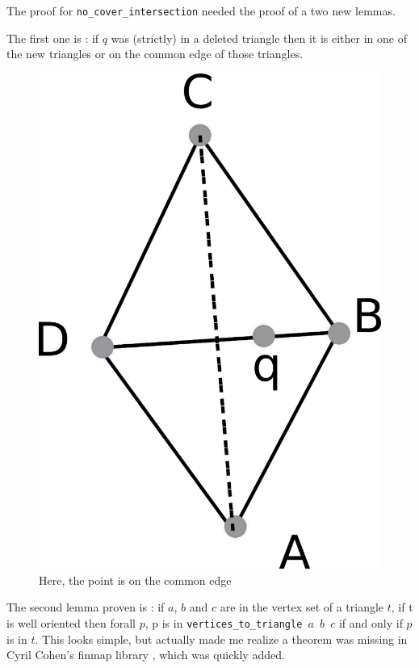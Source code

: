 \documentclass[a4paper,10pt]{article}
\begin{document}
The proof for {\tt no\_cover\_intersection} needed the proof of a two new lemmas.

The first one is : if $q$ was (strictly) in a deleted triangle then it is either in one of the new triangles or on the common edge of those triangles.
\begin{figure}[h]
  \centering
  \caption{Here, the point is on the common edge}
  \includegraphics[scale=2]{flip_edge_nci}
\end{figure}

The second lemma proven is : if $a$, $b$ and $c$ are in the vertex set of a triangle $t$, if t is well oriented then forall $p$, p is in {\tt vertices\_to\_triangle $a$ $b$ $c$} if and only if $p$ is in $t$. This looks simple, but actually made me realize a theorem was missing in Cyril Cohen's finmap library , which was quickly added.
\end{document}
